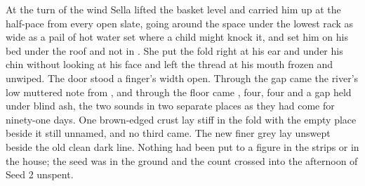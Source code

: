 At the turn of the wind Sella lifted the basket level and carried him up at the half-pace from every open slate, going around the space under the lowest rack as wide as a pail of hot water set where a child might knock it, and set him on his bed under the roof and not in . She put the fold right at his ear and under his chin without looking at his face and left the thread at his mouth frozen and unwiped. The door stood a finger's width open. Through the gap came the river's low muttered note from , and through the floor came , four, four and a gap held under blind ash, the two sounds in two separate places as they had come for ninety-one days. One brown-edged crust lay stiff in the fold with the empty place beside it still unnamed, and no third came. The new finer grey lay unswept beside the old clean dark line. Nothing had been put to a figure in the strips or in the house; the seed was in the ground and the count crossed into the afternoon of Seed 2 unspent.
